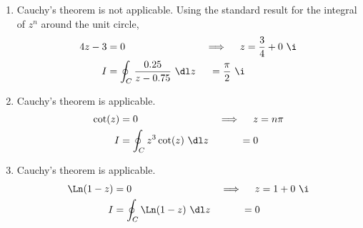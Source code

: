 \begin{enumerate}
    \item Cauchy's theorem \textcolor{y_p}{is not applicable}. Using the standard result
          for the integral of $ z^n $ around the unit circle,
          \begin{align}
              4z - 3           & = 0                                       &
              \implies \quad z & = \frac{3}{4} + 0\ \i                       \\
              I                & = \oint_{C} \frac{0.25}{z - 0.75} \ \dl z
                               & = \frac{\pi}{2}\ \i
          \end{align}

    \item Cauchy's theorem \textcolor{y_h}{is applicable}.
          \begin{align}
              \cot(z)          & = 0                             &
              \implies \quad z & = n\pi                            \\
              I                & = \oint_{C} z^3 \cot(z) \ \dl z
                               & = 0
          \end{align}

    \item Cauchy's theorem \textcolor{y_h}{is applicable}.
          \begin{align}
              \Ln(1-z)         & = 0                          &
              \implies \quad z & = 1 + 0\ \i                    \\
              I                & = \oint_{C} \Ln(1-z) \ \dl z
                               & = 0
          \end{align}
          \begin{figure}[H]
              \centering
          \end{figure}


\end{enumerate}
